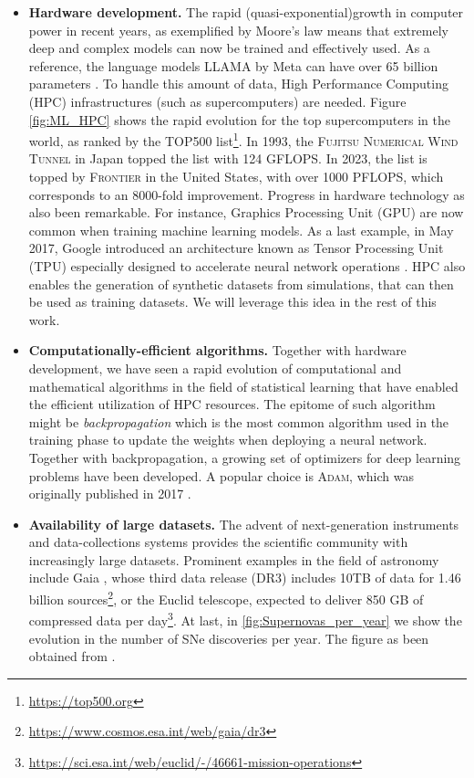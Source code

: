 \begin{itemize}
    \item \textbf{Hardware development.} The rapid (quasi-exponential)growth in computer power in recent years, as exemplified by Moore's law \cite{Moor_law} means that extremely deep and complex models can now be trained and effectively used. As a reference, the language models \textsc{LLAMA} by Meta can have over 65 billion parameters \cite{Llama}. To handle this amount of data, High Performance Computing (HPC) infrastructures (such as supercomputers) are needed. Figure \ref{fig:ML_HPC} shows the rapid evolution for the top supercomputers in the world, as ranked by the TOP500 list\footnote{\url{https://top500.org}}. In 1993, the \textsc{Fujitsu Numerical Wind Tunnel} in Japan topped the list with 124 GFLOPS. In 2023, the list is topped by \textsc{Frontier} in the United States, with over 1000 PFLOPS, which corresponds to an 8000-fold improvement. Progress in hardware technology as also been remarkable. For instance, Graphics Processing Unit (GPU) are now common when training machine learning models. As a last example, in May 2017, Google introduced an architecture known as Tensor Processing Unit (TPU) especially designed to accelerate neural network operations \cite{TPU}. HPC also enables the generation of synthetic datasets from simulations, that can then be used as training datasets. We will leverage this idea in the rest of this work.


    \item \textbf{Computationally-efficient algorithms.} Together with hardware development, we have seen a rapid evolution of computational and mathematical algorithms in the field of statistical learning that have enabled the efficient utilization of HPC resources. The epitome of such algorithm might be \emph{backpropagation} \cite{backprop} which is the most common algorithm used in the training phase to update the weights when deploying a neural network. Together with backpropagation, a growing set of optimizers for deep learning problems have been developed. A popular choice is \textsc{Adam}, which was originally published in 2017 \cite{adam}.

    \item \textbf{Availability of large datasets.} The advent of next-generation instruments and data-collections systems provides the scientific community with increasingly large datasets. Prominent examples in the field of astronomy include Gaia \cite{gaia}, whose third data release (DR3) includes 10TB of data for 1.46 billion sources\footnote{\url{https://www.cosmos.esa.int/web/gaia/dr3}}, or the Euclid telescope, expected to deliver 850 GB of compressed data per day\footnote{\url{https://sci.esa.int/web/euclid/-/46661-mission-operations}}. At last, in \cref{fig:Supernovas_per_year} we show the evolution in the number of SNe discoveries per year. The figure as been obtained from \cite{SN_year}.



    
\end{itemize}

